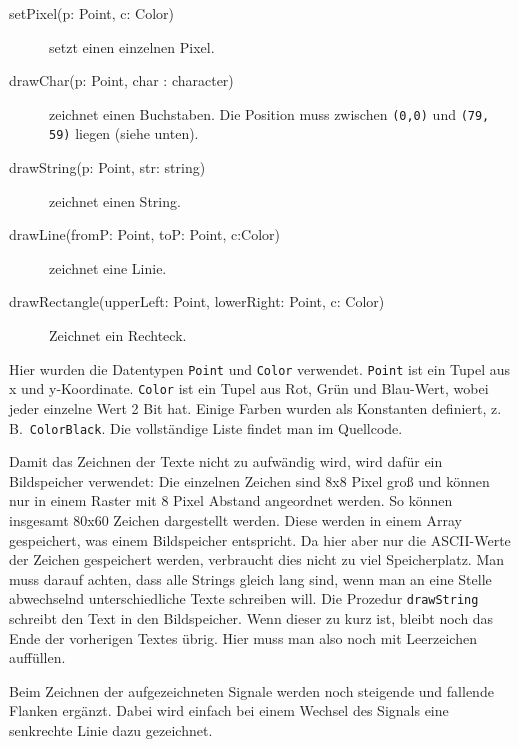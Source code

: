 \documentclass[IN,ngerman,utf8,12pt]{tumbook}
\newcommand{\zB}{z.\,B.\ }
\begin{document}
\begin{description}
    \item[setPixel(p: Point, c: Color)] setzt einen einzelnen Pixel.
    \item[drawChar(p: Point, char : character)] zeichnet einen Buchstaben.
        Die Position muss zwischen \texttt{(0,0)} und \texttt{(79, 59)} liegen (siehe unten).
    \item[drawString(p: Point, str: string)] zeichnet einen String.
    \item[drawLine(fromP: Point, toP: Point, c:Color)] zeichnet eine Linie.
    \item[drawRectangle(upperLeft: Point, lowerRight: Point, c: Color)] Zeichnet ein Rechteck.
\end{description}

Hier wurden die Datentypen \texttt{Point} und \texttt{Color} verwendet.
\texttt{Point} ist ein Tupel aus x und y-Koordinate.
\texttt{Color} ist ein Tupel aus Rot, Grün und Blau-Wert, wobei jeder einzelne Wert 2 Bit hat.
Einige Farben wurden als Konstanten definiert, \zB \texttt{ColorBlack}.
Die vollständige Liste findet man im Quellcode.

Damit das Zeichnen der Texte nicht zu aufwändig wird, wird dafür ein Bildspeicher verwendet:
Die einzelnen Zeichen sind 8x8 Pixel groß und können nur in einem Raster mit 8 Pixel Abstand angeordnet werden.
So können insgesamt 80x60 Zeichen dargestellt werden.
Diese werden in einem Array gespeichert, was einem Bildspeicher entspricht.
Da hier aber nur die ASCII-Werte der Zeichen gespeichert werden, verbraucht dies nicht zu viel Speicherplatz.
Man muss darauf achten, dass alle Strings gleich lang sind, wenn man an eine Stelle abwechselnd unterschiedliche Texte schreiben will.
Die Prozedur \texttt{drawString} schreibt den Text in den Bildspeicher.
Wenn dieser zu kurz ist, bleibt noch das Ende der vorherigen Textes übrig.
Hier muss man also noch mit Leerzeichen auffüllen.

Beim Zeichnen der aufgezeichneten Signale werden noch steigende und fallende Flanken ergänzt.
Dabei wird einfach bei einem Wechsel des Signals eine senkrechte Linie dazu gezeichnet.
\end{document}
